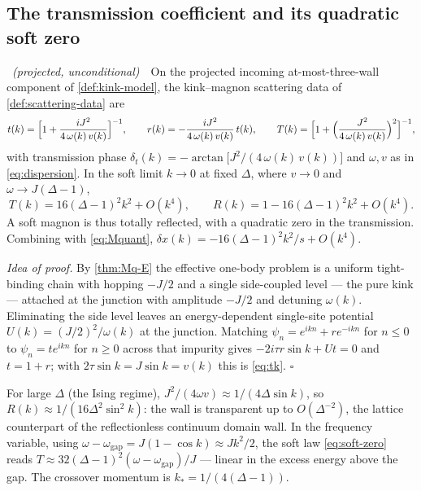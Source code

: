 \subsection{The transmission coefficient and its quadratic soft zero}

\begin{theorem}
\label{thm:M-tk}
\statusProved\ \emph{(projected, unconditional)}\ \ On the projected incoming
at-most-three-wall component of \cref{def:kink-model}, the kink--magnon
scattering data of \cref{def:scattering-data} are
\begin{equation}
  t(k)=\Bigl[1+\frac{iJ^2}{4\,\omega(k)\,v(k)}\Bigr]^{-1},
  \qquad
  r(k)=-\frac{iJ^2}{4\,\omega(k)\,v(k)}\,t(k),
  \qquad
  T(k)=\Bigl[1+\Bigl(\frac{J^2}{4\,\omega(k)\,v(k)}\Bigr)^{2}\Bigr]^{-1},
  \label{eq:tk}
\end{equation}
with transmission phase
$\delta_t(k)=-\arctan\bigl[J^2/(4\,\omega(k)\,v(k))\bigr]$ and $\omega,v$ as in
\eqref{eq:dispersion}. In the soft limit $k\to0$ at fixed $\Delta$, where
$v\to0$ and $\omega\to J(\Delta-1)$,
\begin{equation}
  T(k)=16(\Delta-1)^2k^2+O(k^4),
  \qquad
  R(k)=1-16(\Delta-1)^2k^2+O(k^4).
  \label{eq:soft-zero}
\end{equation}
A soft magnon is thus totally reflected, with a quadratic zero in the
transmission. Combining with \eqref{eq:Mquant},
$\delta x(k)=-16(\Delta-1)^2k^2/s+O(k^4)$.
\end{theorem}

\noindent\emph{Idea of proof.} By \cref{thm:Mq-E} the effective one-body
problem is a uniform tight-binding chain with hopping $-J/2$ and a single
side-coupled level --- the pure kink --- attached at the junction with
amplitude $-J/2$ and detuning $\omega(k)$. Eliminating the side level leaves an
energy-dependent single-site potential $U(k)=(J/2)^2/\omega(k)$ at the
junction. Matching $\psi_n=e^{ikn}+re^{-ikn}$ for $n\le0$ to $\psi_n=te^{ikn}$
for $n\ge0$ across that impurity gives $-2i\tau r\sin k+Ut=0$ and $t=1+r$; with
$2\tau\sin k=J\sin k=v(k)$ this is \eqref{eq:tk}. \hfill$\square$

\begin{remark}
\label{rem:tk-limits}
For large $\Delta$ (the Ising regime), $J^2/(4\omega v)\approx1/(4\Delta\sin k)$,
so $R(k)\approx1/(16\Delta^2\sin^2k)$: the wall is transparent up to
$O(\Delta^{-2})$, the lattice counterpart of the reflectionless continuum domain
wall. In the frequency variable, using
$\omega-\omega_{\mathrm{gap}}=J(1-\cos k)\approx Jk^2/2$, the soft law
\eqref{eq:soft-zero} reads
$T\approx32(\Delta-1)^2(\omega-\omega_{\mathrm{gap}})/J$ --- linear in the
excess energy above the gap. The crossover momentum is $k_*=1/(4(\Delta-1))$.
\end{remark}

